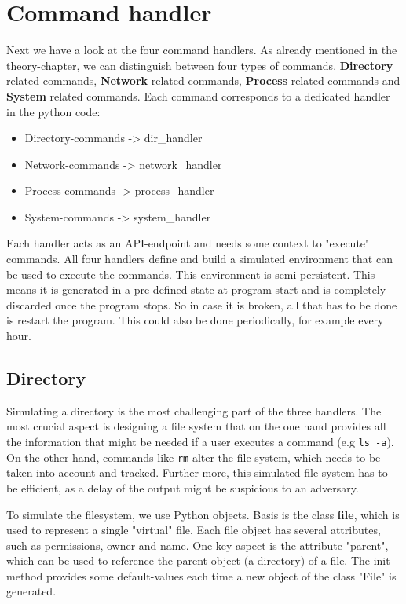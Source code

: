 \section{Command handler}
Next we have a look at the four command handlers.
As already mentioned in the theory-chapter, we can distinguish between four types of commands.
\textbf{Directory} related commands, \textbf{Network} related commands, \textbf{Process} related commands and \textbf{System} related commands.
Each command corresponds to a dedicated handler in the python code:
\begin{itemize}
    \item Directory-commands -> dir\_handler
    \item Network-commands -> network\_handler
    \item Process-commands -> process\_handler
    \item System-commands -> system\_handler
\end{itemize}

Each handler acts as an API-endpoint and needs some context to "execute" commands.
All four handlers define and build a simulated environment that can be used to execute the commands.
This environment is semi-persistent.
This means it is generated in a pre-defined state at program start and is completely discarded once the program stops.
So in case it is broken, all that has to be done is restart the program.
This could also be done periodically, for example every hour.

\subsection{Directory}
Simulating a directory is the most challenging part of the three handlers.
The most crucial aspect is designing a file system that on the one hand provides all the information that might be needed if a user executes a command (e.g \texttt{ls -a}).
On the other hand, commands like \texttt{rm} alter the file system, which needs to be taken into account and tracked. Further more, this simulated file system has to be efficient, as a delay of the output might be suspicious to an adversary.

To simulate the filesystem, we use Python objects.
Basis is the class \textbf{file}, which is used to represent a single "virtual" file.
Each file object has several attributes, such as permissions, owner and name.
One key aspect is the attribute "parent", which can be used to reference the parent object (a directory) of a file.
The init-method provides some default-values each time a new object of the class "File" is generated.

